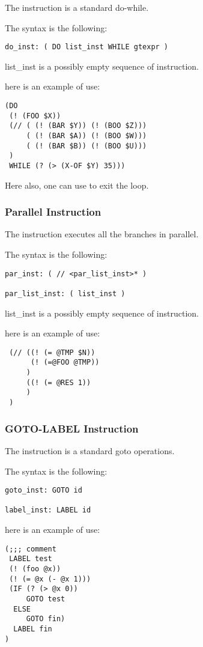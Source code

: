 The  instruction is a standard do-while.

The syntax is the following:
\begin{verbatim}
do_inst: ( DO list_inst WHILE gtexpr )
\end{verbatim}

list\_inst is a possibly empty sequence of instruction.

here is an example of use:
\begin{verbatim}
(DO 
 (! (FOO $X))
 (// ( (! (BAR $Y)) (! (BOO $Z)))
     ( (! (BAR $A)) (! (BOO $W)))
     ( (! (BAR $B)) (! (BOO $U)))
 )
 WHILE (? (> (X-OF $Y) 35)))
\end{verbatim}

Here also, one can use  to exit the loop.

\subsubsection{Parallel Instruction}

The \code{//} instruction executes all the branches in parallel.

The syntax is the following:
\begin{verbatim}
par_inst: ( // <par_list_inst>* )

par_list_inst: ( list_inst )
\end{verbatim}

list\_inst is a possibly empty sequence of instruction.

here is an example of use:
\begin{verbatim}
 (// ((! (= @TMP $N))
      (! (=@FOO @TMP))
     )
     ((! (= @RES 1))
     )
 )
\end{verbatim}

\subsubsection{GOTO-LABEL Instruction}


The  instruction is a standard goto operations.

The syntax is the following:
\begin{verbatim}
goto_inst: GOTO id

label_inst: LABEL id
\end{verbatim}

here is an example of use:
\begin{verbatim}
(;;; comment
 LABEL test
 (! (foo @x))
 (! (= @x (- @x 1)))
 (IF (? (> @x 0))
     GOTO test
  ELSE
     GOTO fin)
  LABEL fin
)
\end{verbatim}

